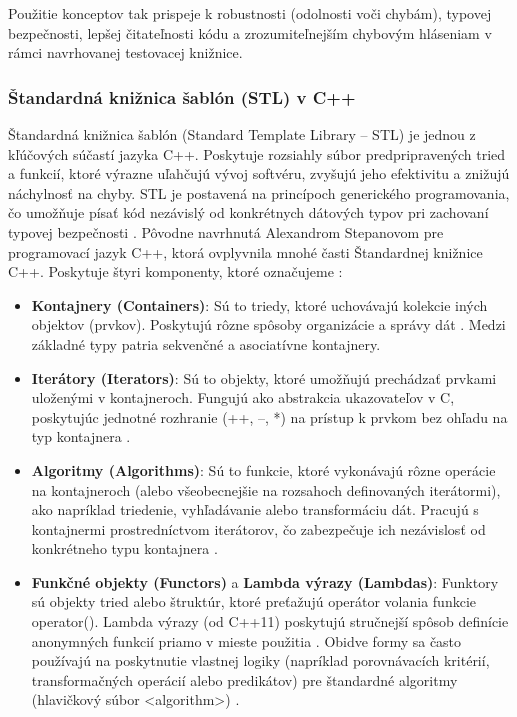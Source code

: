 \documentclass[11pt]{article}
\begin{document}
\noindent Použitie konceptov tak prispeje k robustnosti (odolnosti voči chybám), typovej bezpečnosti, lepšej čitateľnosti kódu a zrozumiteľnejším chybovým hláseniam v rámci navrhovanej testovacej knižnice.

\subsubsection{Štandardná knižnica šablón (STL) v C++}

Štandardná knižnica šablón (Standard Template Library -- STL) je jednou z kľúčových súčastí jazyka C++. Poskytuje rozsiahly súbor predpripravených tried a funkcií, ktoré výrazne uľahčujú vývoj softvéru, zvyšujú jeho efektivitu a znižujú náchylnosť na chyby. STL je postavená na princípoch generického programovania, čo umožňuje písať kód nezávislý od konkrétnych dátových typov pri zachovaní typovej bezpečnosti \cite{10162792}. Pôvodne navrhnutá Alexandrom Stepanovom pre programovací jazyk C++, ktorá ovplyvnila mnohé časti Štandardnej knižnice C++. Poskytuje štyri komponenty, ktoré označujeme \cite{c++_holzner}:

\begin{itemize}
  \item \textbf{Kontajnery (Containers)}: Sú to triedy, ktoré uchovávajú kolekcie iných objektov (prvkov). Poskytujú rôzne spôsoby organizácie a správy dát \cite{c++_holzner}. Medzi základné typy patria sekvenčné a asociatívne kontajnery.
  \item \textbf{Iterátory (Iterators)}: Sú to objekty, ktoré umožňujú prechádzať prvkami uloženými v kontajneroch. Fungujú ako abstrakcia ukazovateľov v C, poskytujúc jednotné rozhranie (++, --, *) na prístup k prvkom bez ohľadu na typ kontajnera \cite{c++_holzner}.
  \item \textbf{Algoritmy (Algorithms)}: Sú to funkcie, ktoré vykonávajú rôzne operácie na kontajneroch (alebo všeobecnejšie na rozsahoch definovaných iterátormi), ako napríklad triedenie, vyhľadávanie alebo transformáciu dát. Pracujú s kontajnermi prostredníctvom iterátorov, čo zabezpečuje ich nezávislosť od konkrétneho typu kontajnera \cite{c++_holzner}.
  \item \textbf{Funkčné objekty (Functors)} a \textbf{Lambda výrazy (Lambdas)}: Funktory sú objekty tried alebo štruktúr, ktoré preťažujú operátor volania funkcie operator(). Lambda výrazy (od C++11) poskytujú stručnejší spôsob definície anonymných funkcií priamo v mieste použitia \cite{10162792}. Obidve formy sa často používajú na poskytnutie vlastnej logiky (napríklad porovnávacích kritérií, transformačných operácií alebo predikátov) pre štandardné algoritmy (hlavičkový súbor <algorithm>) \cite{geeksforgeeks_functors}.
\end{itemize}
\end{document}

